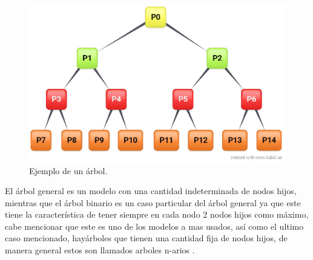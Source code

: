 \begin{figure}[h]
\centering
\includegraphics[width=0.8\columnwidth]{chap3/Imagenes/Arbol.eps}
\caption{Ejemplo de un \'arbol.}
\label{fig:iarbol}
\end{figure}

El \'arbol general es un modelo con una cantidad indeterminada de nodos hijos,
 mientras que el \'arbol binario es un caso particular del \'arbol general ya que
 este tiene la caracter\'istica de tener siempre en cada nodo 2 nodos hijos como
 m\'aximo, cabe mencionar que este es uno de los modelos a mas usados, as\'i como
 el ultimo caso mencionado, hay\'arboles que tienen una cantidad fija de nodos
 hijos, de manera general estos son llamados arboles n-arios
 \cite{gutierrez1999estructuras}.